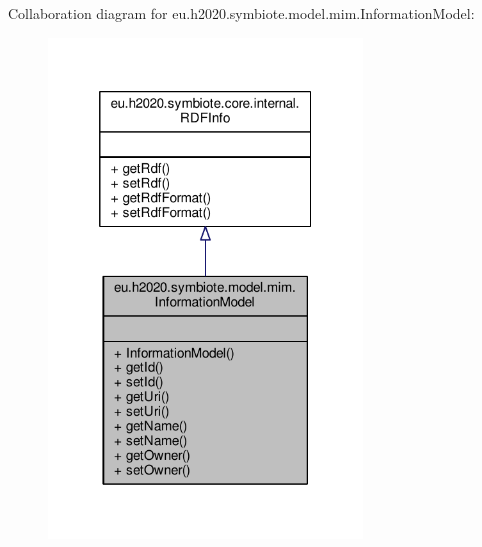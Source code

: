 Collaboration diagram for eu.\+h2020.\+symbiote.\+model.\+mim.\+Information\+Model\+:\nopagebreak
\begin{figure}[H]
\begin{center}
\leavevmode
\includegraphics[width=236pt]{classeu_1_1h2020_1_1symbiote_1_1model_1_1mim_1_1InformationModel__coll__graph}
\end{center}
\end{figure}
